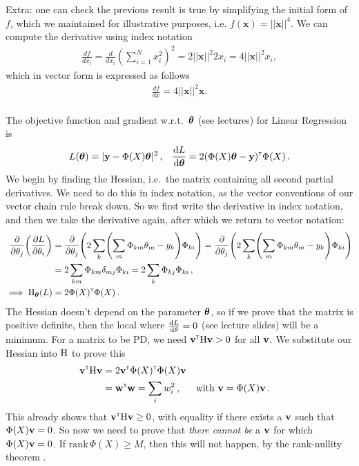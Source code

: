 \begin{enumerate}[label=\alph*.]
Extra: one can check the previous result is true by simplifying the initial form of $f$, which we maintained for illustrative purposes, i.e. $f(\textbf{x}) = ||\textbf{x}||^4$. We can compute the derivative using index notation
\begin{align*}
\frac{df}{d x_i} = \frac{d}{d x_i}\left(\sum_{i=1}^N x_i^2 \right)^2 = 2||\textbf{x}||^2 2x_i = 4||\textbf{x}||^2 x_i,
\end{align*}
which in vector form is expressed as follows
\begin{align*}
\frac{df}{d x} = 4||\textbf{x}||^2 \textbf{x}.
\end{align*}

\end{enumerate}


\paragraph{}
The objective function and gradient w.r.t.~$\vtheta$ (see lectures) for Linear Regression is
\begin{align}
L(\vtheta) = \norm{\vy - \Phi(X)\vtheta}^2 \,, &&
\deriv[L]{\vtheta} = 2(\Phi(X)\vtheta - \vy)\transpose\Phi(X) \,.
\end{align}
We begin by finding the Hessian, i.e.~the matrix containing all second partial derivatives. We need to do this in index notation, as the vector conventions of our vector chain rule break down. So we first write the derivative in index notation, and then we take the derivative again, after which we return to vector notation:
\begin{align}
\pderiv[]{\theta_j} \left(\pderiv[L]{\theta_i}\right) &=
\pderiv[]{\theta_j} \left(2\sum_k\left(\sum_m\Phi_{km}\theta_m - y_k\right)\Phi_{ki}\right) =
\pderiv[]{\theta_j} \left(2\sum_k\left(\sum_m\Phi_{km}\theta_m - y_k\right)\Phi_{ki}\right) \\
&= 2\sum_{km}\Phi_{km}\delta_{mj}\Phi_{ki} = 2\sum_{k}\Phi_{kj}\Phi_{ki} \,, \\
\implies \mat H_{\vtheta}(L) &= 2 \Phi(X)\transpose\Phi(X) \,.
\end{align}
The Hessian doesn't depend on the parameter $\vtheta$, so if we prove that the matrix is positive definite, then the local where $\deriv[L]{\theta} = 0$ (see lecture slides) will be a minimum. For a matrix to be PD, we need $\vv\transpose\mat H\vv > 0$ for all $\vv$. We substitute our Hessian into $\mat H$ to prove this
\begin{align}
\vv\transpose \mat H \vv &= 2\vv\transpose \Phi(X)\transpose\Phi(X) \vv \\
&= \vw\transpose\vw = \sum_i w_i^2\,, && \text{with } \vv = \Phi(X)\vv\,.
\end{align}
This already shows that $\vv\transpose \mat H \vv \geq 0$, with equality if there exists a $\vv$ such that $\Phi(X)\vv = 0$. So now we need to prove that \emph{there cannot be} a $\vv$ for which $\Phi(X)\vv = 0$. If $\mathrm{rank}\,\Phi(X) \geq M$, then this will not happen, by the rank-nullity theorem \citep[\S 2.7.3]{mml}.

